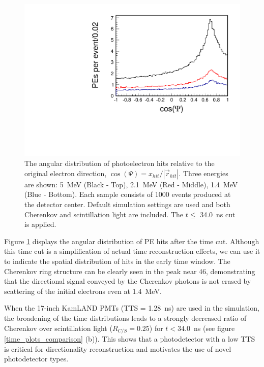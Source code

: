 \documentclass[cits]{JINST}
\begin{document}
\begin{figure}
        \begin{center}
        \includegraphics[scale=0.40]{graphs2/combination_cos_psi_34_h.pdf}
        \caption[]{The angular distribution of photoelectron hits
        relative to the original electron direction, $\cos(\Psi) =
        x_{hit}/|\vec{r}_{hit}|$. Three energies are shown: 5~MeV (Black - Top), 2.1~MeV (Red - Middle), 1.4~MeV (Blue - Bottom). Each sample consists of 1000 events produced at the detector center. Default
        simulation settings are used and both Cherenkov and
        scintillation light are included. The $t\leq$ 34.0~ns cut is applied.} 
        \label{Cherenkov_cone}
        \end{center}
\end{figure}

Figure \ref{Cherenkov_cone} displays the angular distribution of PE
hits after the time cut. Although this time cut is a simplification of actual time
reconstruction effects, we can use it to indicate the spatial
distribution of hits in the early time window. The Cherenkov ring structure
can be clearly seen in the peak near 46\textdegree, demonstrating
that the directional signal conveyed by the Cherenkov photons is not
erased by scattering of the initial electrons even at 1.4~MeV.

When the 17-inch KamLAND PMTs\cite{tajimaMaster,kume_1983} (TTS =
1.28~ns) are used in the simulation, the broadening of the time
distributions leads to a strongly decreased ratio of Cherenkov over
scintillation light ($R_{C/S}=0.25$) for $t<34.0$~ns (see
figure \ref{time_plots_comparison} (b)). This shows that a
photodetector with a low TTS is critical for directionality reconstruction and
motivates the use of novel photodetector types.
\end{document}
